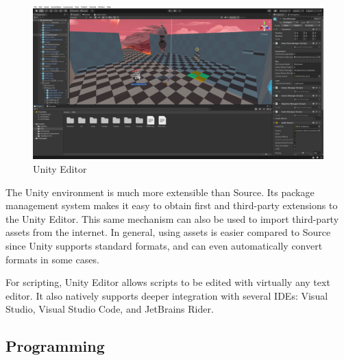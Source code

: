 \documentclass[a4paper, 12pt]{scrartcl}
\begin{document}
\begin{figure}[!htb]
  \centering
  \includegraphics[width=\linewidth]{images/unity_editor.png}
  \caption{Unity Editor}
\end{figure}

The Unity environment is much more extensible than Source. Its package management system makes it easy to obtain first and third-party extensions to the Unity Editor. This same mechanism can also be used to import third-party assets from the internet. In general, using assets is easier compared to Source since Unity supports standard formats, and can even automatically convert formats in some cases.

For scripting, Unity Editor allows scripts to be edited with virtually any text editor. It also natively supports deeper integration with several IDEs: Visual Studio, Visual Studio Code, and JetBrains Rider.

\subsection{Programming}
\end{document}
